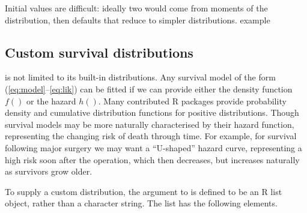 \documentclass[nojss,nofooter]{jss}
\begin{document}
Initial values are difficult: ideally two would come from moments of
the distribution, then defaults that reduce to simpler distributions.
example

\subsection{Custom survival distributions}

 is not limited to its built-in distributions.  Any
survival model of the form (\ref{eq:model}--\ref{eq:lik}) can be
fitted if we can provide either the density function $f()$ or the
hazard $h()$.  Many contributed R packages provide probability density
and cumulative distribution functions for positive distributions.  
Though survival models may be more naturally characterised by their
hazard function, representing the changing risk of death through time.
For example, for survival following major surgery we may want a
``U-shaped'' hazard curve, representing a high risk soon after the
operation, which then decreases, but increases naturally as survivors
grow older.

To supply a custom distribution, the  argument to
 is defined to be an R list object, rather than a
character string.  The list has the following elements.
\end{document}
